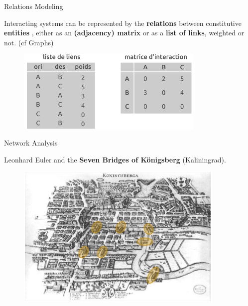 \begin{frame}{Relations Modeling}

Interacting systems can be represented  by the \textbf{relations} between constitutive \textbf{entities} , either as an \textbf{(adjacency) matrix} or as a \textbf{list of links}, weighted or not. (cf Graphs)

\begin{figure}
  \includegraphics[width=9cm]{MatriceOD.pdf}
\end{figure}

\end{frame}



\begin{frame}{Network Analysis}

Leonhard Euler and the \textbf{Seven Bridges of Königsberg} (Kaliningrad).


\begin{figure}
  \includegraphics[width=10cm]{Konigsberg.png}
\end{figure}

\end{frame}


